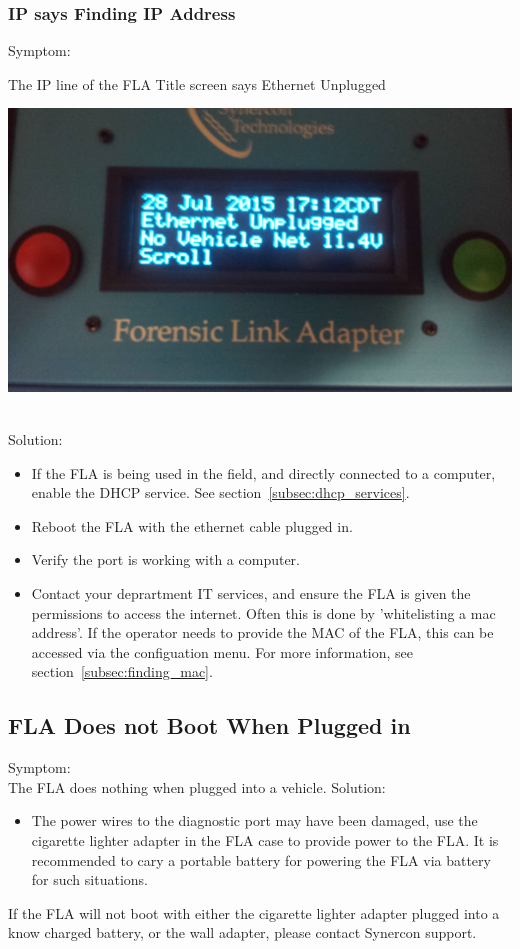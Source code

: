 \documentclass[11pt]{article}
\begin{document}
\subsubsection{IP says Finding IP Address}
Symptom:\\
\noindent\begin{minipage}{0.45\textwidth}%
The IP line of the FLA Title screen says Ethernet Unplugged
\end{minipage}%
\hfill%
\begin{minipage}{0.45\textwidth}
\includegraphics[width=\linewidth]{./fla_screens/title_screen_eth_unplug}
\end{minipage}\\
Solution:\\
\begin{itemize}
\item If the FLA is being used in the field, and directly connected to a computer, enable the DHCP service. See section~\ref{subsec:dhcp_services}.
\item Reboot the FLA with the ethernet cable plugged in.
\item Verify the port is working with a computer.
\item Contact your deprartment IT services, and ensure the FLA is given the permissions to access the internet. Often this is done by 'whitelisting a mac address'. If the operator needs to provide the MAC of the FLA, this can be accessed via the configuation menu. For more information, see section~\ref{subsec:finding_mac}.
\end{itemize}
\subsection{FLA Does not Boot When Plugged in}
Symptom:\\
The FLA does nothing when plugged into a vehicle.
Solution:\\
\begin{itemize}
\item The power wires to the diagnostic port may have been damaged, use the cigarette lighter adapter in the FLA case to provide power to the FLA. It is recommended to cary a portable battery for powering the FLA via battery for such situations.
\end{itemize}
If the FLA will not boot with either the cigarette lighter adapter plugged into a know charged battery, or the wall adapter, please contact Synercon support.
\end{document}
